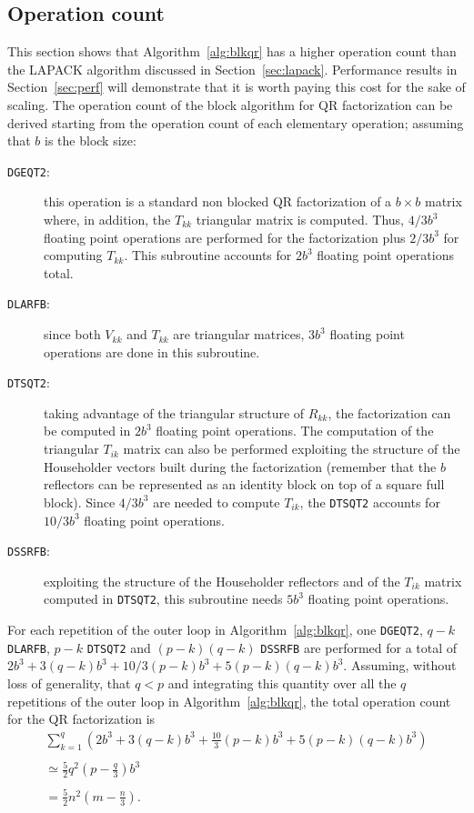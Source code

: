 \documentclass[runningheads]{llncs}
\begin{document}
\subsection{Operation count}

This section shows that Algorithm~\ref{alg:blkqr} has a
higher operation count than the LAPACK algorithm discussed in
Section~\ref{sec:lapack}. Performance results in
Section~\ref{sec:perf} will demonstrate that it is worth paying this
cost for the sake of scaling.
The operation count of the block algorithm for QR factorization can be derived starting
from the operation count of each elementary operation; assuming that
$b$ is the block size:
\begin{description}
\item[\texttt{DGEQT2}:] this operation is a standard non blocked QR
  factorization of a $b \times b$ matrix where, in addition, the
  $T_{kk}$ triangular matrix is computed. Thus, $4/3 b^3$ floating
  point operations are performed for the factorization plus $2/3b^3$
  for computing $T_{kk}$. This subroutine accounts for $2b^3$ floating
  point operations total.

\item[\texttt{DLARFB}:] since both $V_{kk}$ and $T_{kk}$ are
  triangular matrices, $3b^3$ floating point operations are done in
  this subroutine.
\item[\texttt{DTSQT2}:] taking advantage of the triangular structure of
  $R_{kk}$, the factorization can be computed in $2b^3$ floating point
  operations. The computation of the triangular $T_{ik}$ matrix can
  also be performed exploiting the structure of the Householder
  vectors built during the factorization (remember that the $b$
  reflectors can be represented as an identity block on top of a
  square full block). Since $4/3b^3$ are needed to compute $T_{ik}$,
  the \texttt{DTSQT2} accounts for $10/3b^3$ floating point operations.
\item[\texttt{DSSRFB}:] exploiting the structure of the Householder
  reflectors and of the $T_{ik}$ matrix computed in \texttt{DTSQT2},
  this subroutine needs $5b^3$ floating point operations.
\end{description}

For each repetition of the outer loop in Algorithm~\ref{alg:blkqr},
one \texttt{DGEQT2}, $q-k$ \texttt{DLARFB}, $p-k$ \texttt{DTSQT2} and
$(p-k)(q-k)$ \texttt{DSSRFB} are performed for a total of
$2b^3+3(q-k)b^3+10/3(p-k)b^3+5(p-k)(q-k)b^3$. Assuming, without loss
of generality, that $q<p$ and integrating this quantity over all the
$q$ repetitions of the outer loop in Algorithm~\ref{alg:blkqr}, the
total operation count for the QR factorization is
\begin{equation}
  \label{eq:opcount}
  \begin{array}{l}
  \sum_{k=1}^{q}(2b^3+3(q-k)b^3+\frac{10}{3}(p-k)b^3+5(p-k)(q-k)b^3)\\
  \\
  \simeq \frac{5}{2}q^2(p-\frac{q}{3})b^3 \\
  \\
  = \frac{5}{2}n^2(m-\frac{n}{3}).
  \end{array}
\end{equation}
\end{document}
